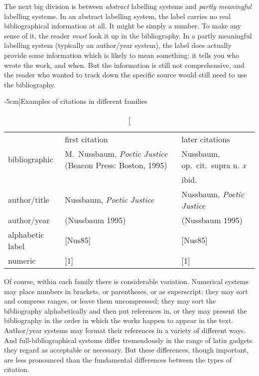 The next big division is between \emph{abstract} labelling systems and
\emph{partly meaningful} labelling systems. In an abstract labelling
system, the label carries no real bibliographical information at all.
It might be simply a number. To make any sense of it, the reader
\emph{must} look it up in the bibliography. In a partly meaningful
labelling system (typically an author/year system), the label does
actually provide some information which is likely to mean something:
it tells you who wrote the work, and when. But the information is
still not comprehensive, and the reader who wanted to track down the
specific source would still need to use the bibliography.

\begin{table*}[tbh]
\caption[][-5cm]{Examples of citations in different families}
\begin{tabular}{lp{6cm}p{6cm}}
\toprule
& \textsf{first citation} & \textsf{later citations} \\
\cmidrule(lr){2-2}\cmidrule(lr){3-3}
\textsf{bibliographic} & M.\ Nussbaum, \emph{Poetic Justice} (Beacon
Press: Boston, 1995) & Nussbaum, op.\ cit.\ supra n. \emph{x}\\
& & ibid. \\
\textsf{author/title} & Nussbaum, \emph{Poetic Justice} & Nussbaum,
\emph{Poetic Justice}\\
\textsf{author/year} & (Nussbaum 1995) & (Nussbaum 1995) \\
\textsf{alphabetic label} & [Nus85] & [Nus85]\\
\textsf{numeric} & [1] & [1] \\
\bottomrule
\end{tabular}
\end{table*}

Of course, within each family there is considerable
variation. Numerical systems may place numbers in brackets, or
parentheses, or as superscript; they may sort and compress ranges, or leave
them uncompressed; they may sort the bibliography alphabetically and
then put references in, or they may present the bibliography in the
order in which the works happen to appear in the
text. Author/year
systems may format their references in a variety of different
ways. And full-bibliographical systems differ tremendously in the
range of latin gadgets they regard as acceptable or necessary. But
these differences, though important, are less pronounced than the
fundamental differences between the types of citation.

